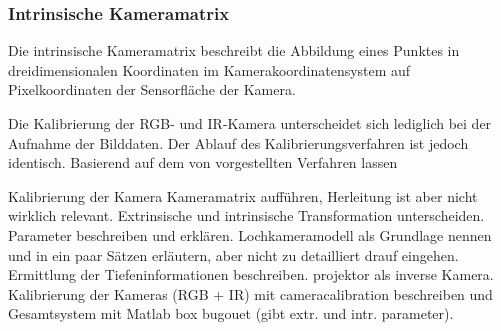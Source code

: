 \subsubsection{Intrinsische Kameramatrix}
Die intrinsische Kameramatrix beschreibt die Abbildung eines Punktes in dreidimensionalen Koordinaten im Kamerakoordinatensystem auf Pixelkoordinaten der Sensorfläche der Kamera.





Die Kalibrierung der RGB- und IR-Kamera unterscheidet sich lediglich bei der Aufnahme der Bilddaten. Der Ablauf des Kalibrierungsverfahren ist jedoch identisch.
Basierend auf dem von  vorgestellten Verfahren lassen 

\red[Vereinfachung später, dass T-WELT = T-0]
Kalibrierung der Kamera
Kameramatrix aufführen, Herleitung ist aber nicht wirklich relevant. Extrinsische und intrinsische Transformation unterscheiden. Parameter beschreiben und erklären. Lochkameramodell als Grundlage nennen und in ein paar Sätzen erläutern, aber nicht zu detailliert drauf eingehen. Ermittlung der Tiefeninformationen beschreiben. projektor als inverse Kamera.\\
Kalibrierung der Kameras (RGB + IR) mit cameracalibration beschreiben und Gesamtsystem mit Matlab box bugouet (gibt extr. und intr. parameter). 




